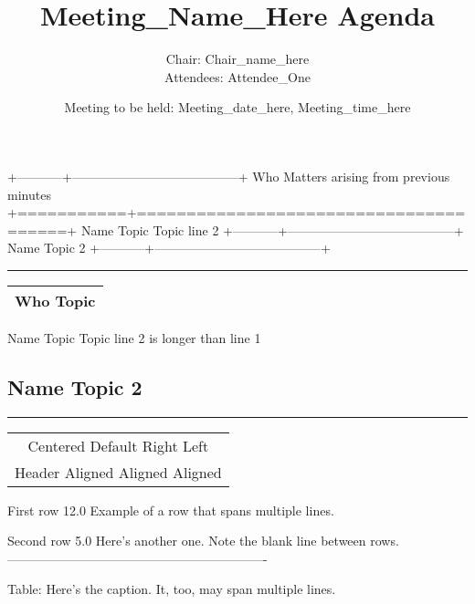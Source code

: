 \documentclass[]{article}
\title{Meeting\_Name\_Here Agenda}
\author{Chair: Chair\_name\_here\\
Attendees: Attendee\_One}
\date{Meeting to be held: Meeting\_date\_here, Meeting\_time\_here}
\begin{document}
\maketitle

+-----------+---------------------------------------+ \textbar{} Who
\textbar{} Matters arising from previous minutes \textbar{}
+===========+=======================================+ \textbar{} Name
\textbar{} Topic \textbar{} \textbar{} \textbar{} Topic line 2
\textbar{} +-----------+---------------------------------------+\\
\textbar{} Name \textbar{} Topic 2 \textbar{}
+-----------+---------------------------------------+

\begin{center}\rule{0.5\linewidth}{\linethickness}\end{center}

\begin{longtable}[]{@{}c@{}}
\toprule
Who Topic\tabularnewline
\bottomrule
\end{longtable}

Name Topic Topic line 2 is longer than line 1

\subsection{Name Topic 2}\label{name-topic-2}

\begin{center}\rule{0.5\linewidth}{\linethickness}\end{center}

\begin{longtable}[]{@{}c@{}}
\toprule
Centered Default Right Left\tabularnewline
Header Aligned Aligned Aligned\tabularnewline
\bottomrule
\end{longtable}

First row 12.0 Example of a row that spans multiple lines.

Second row 5.0 Here's another one. Note the blank line between rows.
-------------------------------------------------------------

Table: Here's the caption. It, too, may span multiple lines.
\end{document}

